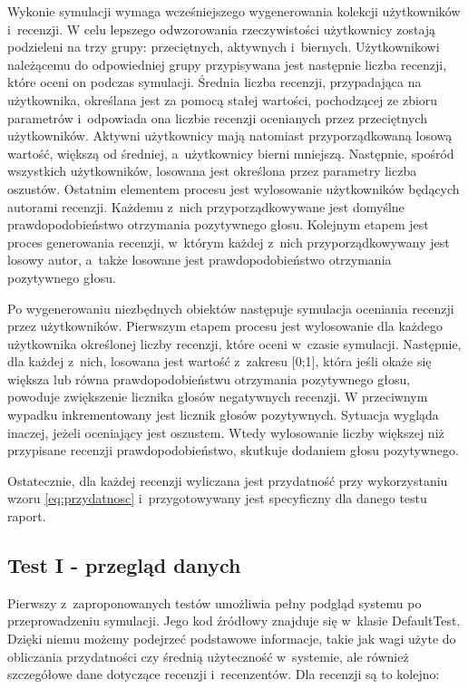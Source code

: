 Wykonie symulacji wymaga wcześniejszego wygenerowania kolekcji użytkowników i~recenzji. W celu lepszego odwzorowania rzeczywistości użytkownicy zostają podzieleni na trzy grupy: przeciętnych, aktywnych i~biernych. Użytkownikowi należącemu do odpowiedniej grupy przypisywana jest następnie liczba recenzji, które oceni on podczas symulacji. Średnia liczba recenzji, przypadająca na użytkownika, określana jest za pomocą stałej wartości, pochodzącej ze zbioru parametrów i~odpowiada ona liczbie recenzji ocenianych przez przeciętnych użytkowników. Aktywni użytkownicy  mają natomiast przyporządkowaną losową wartość, większą od średniej, a~użytkownicy bierni mniejszą. Następnie, spośród wszystkich użytkowników, losowana jest określona przez parametry liczba oszustów. Ostatnim elementem procesu jest wylosowanie użytkowników będących autorami recenzji. Każdemu z~nich przyporządkowywane jest domyślne prawdopodobieństwo otrzymania pozytywnego głosu. Kolejnym etapem jest proces generowania recenzji, w~którym każdej z~nich przyporządkowywany jest losowy autor, a~także losowane jest prawdopodobieństwo otrzymania pozytywnego głosu.

Po wygenerowaniu niezbędnych obiektów następuje symulacja oceniania recenzji przez użytkowników. Pierwszym etapem procesu jest wylosowanie dla każdego użytkownika określonej liczby recenzji, które oceni w~czasie symulacji. Następnie, dla każdej z~nich, losowana jest wartość z~zakresu [0;1], która jeśli okaże się większa lub równa prawdopodobieństwu otrzymania pozytywnego głosu, powoduje zwiększenie licznika głosów negatywnych recenzji. W przeciwnym wypadku inkrementowany jest licznik głosów pozytywnych. Sytuacja wygląda inaczej, jeżeli oceniający jest oszustem. Wtedy wylosowanie liczby większej niż przypisane recenzji prawdopodobieństwo, skutkuje dodaniem głosu pozytywnego. 

Ostatecznie, dla każdej recenzji wyliczana jest przydatność przy wykorzystaniu wzoru \ref{eq:przydatnosc} i~przygotowywany jest specyficzny dla danego testu raport.

\subsection{Test I - przegląd danych}

Pierwszy z~zaproponowanych testów umożliwia pełny podgląd systemu po przeprowadzeniu symulacji. Jego kod źródłowy znajduje się w~klasie DefaultTest. Dzięki niemu możemy podejrzeć podstawowe informacje, takie jak wagi użyte do obliczania przydatności czy średnią użyteczność w~systemie, ale również szczegółowe dane dotyczące recenzji i~recenzentów. Dla recenzji są to kolejno:

